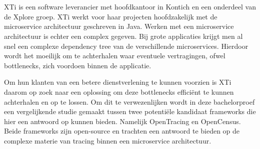 
%
%

%



\chapter*{}
XTi is een software leverancier met hoofdkantoor in Kontich en een onderdeel van de Xplore groep. XTi werkt voor haar projecten hoofdzakelijk met de microservice architectuur geschreven in Java. Werken met een microservice architectuur is echter een complex gegeven. Bij grote applicaties krijgt men al snel een complexe dependency tree van de verschillende microservices. Hierdoor wordt het moeilijk om te achterhalen waar eventuele vertragingen, ofwel bottlenecks, zich voordoen binnen de applicatie.

Om hun klanten van een betere dienstverlening te kunnen voorzien is XTi daarom op zoek naar een oplossing om deze bottlenecks efficiënt te kunnen achterhalen en op te lossen. Om dit te verwezenlijken wordt in deze bachelorproef een vergelijkende studie gemaakt tussen twee potentiële kandidaat frameworks die hier een antwoord op kunnen bieden. Namelijk OpenTracing en OpenCensus. Beide frameworks zijn open-source en trachten een antwoord te bieden op de complexe materie van tracing binnen een microservice architectuur.

